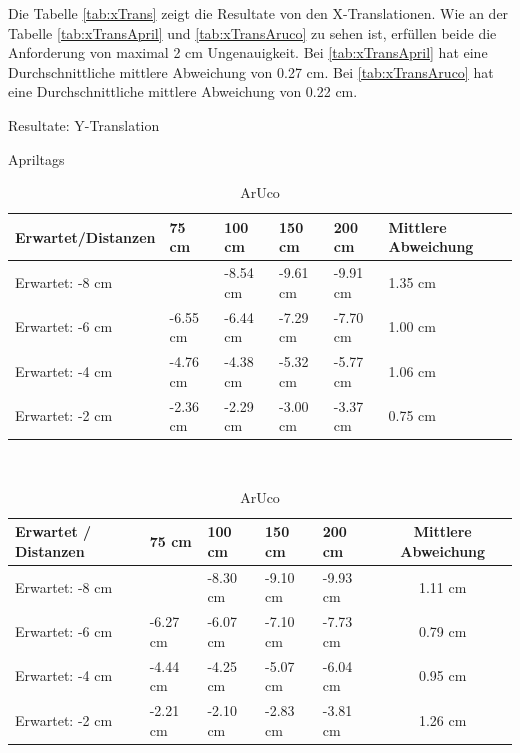 Die Tabelle \ref{tab:xTrans} zeigt die Resultate von den X-Translationen. 
Wie an der Tabelle \ref{tab:xTransApril} und \ref{tab:xTransAruco} zu sehen ist, erfüllen beide die Anforderung von maximal 2 cm Ungenauigkeit.
Bei \ref{tab:xTransApril} hat eine Durchschnittliche mittlere Abweichung von 0.27 cm. 
Bei \ref{tab:xTransAruco} hat eine Durchschnittliche mittlere Abweichung von 0.22 cm. 

\begin{table}[!htb]
    \caption{Resultate: Y-Translation}
    \label{tab:yTrans}
    \begin{subtable}{.5\linewidth}
        \caption{Apriltags}
        \label{tab:yTransApriltag}
        \begin{tabular}{|l|l|l|l|l|l|}
            \hline
            Erwartet/Distanzen & 75 cm & 100 cm & 150 cm & 200 cm & Mittlere Abweichung\\
            \hline
            Erwartet:   -8 cm &          & -8.54 cm & -9.61 cm & -9.91 cm & 1.35 cm\\
            \hline
            Erwartet:   -6 cm & -6.55 cm & -6.44 cm  & -7.29 cm & -7.70 cm & 1.00 cm\\
            \hline
            Erwartet:   -4 cm & -4.76 cm & -4.38 cm & -5.32 cm & -5.77 cm & 1.06 cm\\
            \hline
            Erwartet:   -2 cm & -2.36 cm  & -2.29 cm & -3.00 cm & -3.37 cm & 0.75 cm\\
            \hline
        \end{tabular}
    \end{subtable}
    \\[\smallskipamount]
    \begin{subtable}{.5\linewidth}
        \caption{ArUco}
        \label{tab:yTransAruco}
            \begin{tabular}{|l|l|l|l|l|c|}
            \hline
            Erwartet / Distanzen & 75 cm & 100 cm & 150 cm & 200 cm & Mittlere Abweichung \\
            \hline
            Erwartet:   -8 cm &          & -8.30 cm & -9.10 cm & -9.93 cm & 1.11 cm \\
            \hline
            Erwartet:   -6 cm & -6.27 cm  & -6.07 cm & -7.10 cm & -7.73 cm & 0.79 cm\\
            \hline
            Erwartet:   -4 cm & -4.44 cm & -4.25 cm & -5.07 cm & -6.04 cm & 0.95 cm \\
            \hline
            Erwartet:   -2 cm & -2.21 cm & -2.10 cm  & -2.83 cm & -3.81 cm & 1.26 cm\\
            \hline
        \end{tabular}
    \end{subtable} 
\end{table}

